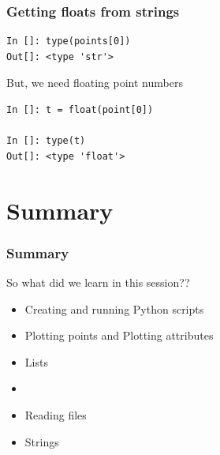 \documentclass[14pt,compress]{beamer}
\newcommand{\kwrd}[1]{ \texttt{\textbf{\color{blue}{#1}}}  }
\begin{document}
\begin{frame}[fragile]
\frametitle{Getting floats from strings}
  \begin{lstlisting}
In []: type(points[0])
Out[]: <type 'str'>
  \end{lstlisting}
But, we need floating point numbers
  \begin{lstlisting}
In []: t = float(point[0])

In []: type(t)
Out[]: <type 'float'>
  \end{lstlisting}
\end{frame}

\section {Summary}
\begin{frame}
\frametitle{Summary}
So what did we learn in this session??
\begin{itemize}
  \item Creating and running Python scripts
  \item Plotting points and Plotting attributes
  \item Lists
  \item \kwrd{for}
  \item Reading files
  \item Strings
\end{itemize}
\end{frame}
\end{document}
